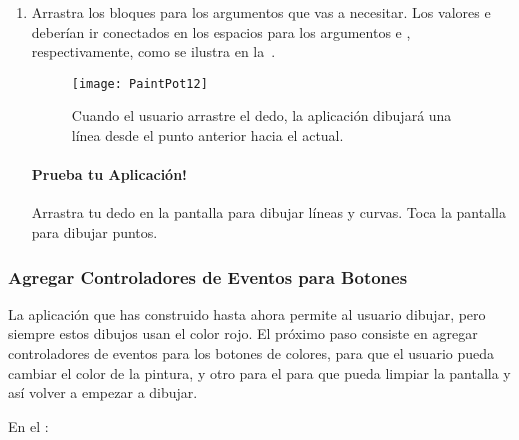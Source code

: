 \begin{enumerate}
\item Arrastra los bloques  para los argumentos que vas a
  necesitar. Los valores  e 
  deberían ir conectados en los espacios para los
  argumentos  e , respectivamente, como se
  ilustra en la~.

\begin{figure}[H]
\centering
\texttt{[image: PaintPot12]}
\caption{Cuando el usuario arrastre el dedo, la aplicación dibujará
  una línea desde el punto anterior hacia el actual.}
\label{fig:PaintPot12}
\end{figure}

\paragraph{Prueba tu Aplicación!} Arrastra tu dedo en la pantalla para
dibujar líneas y curvas. Toca la pantalla para dibujar puntos.

\end{enumerate}

\subsubsection*{Agregar Controladores de Eventos para Botones}

La aplicación que has construido hasta ahora permite al usuario
dibujar, pero siempre estos dibujos usan el color rojo. El próximo
paso consiste en agregar controladores de eventos para los botones de
colores, para que el usuario pueda cambiar el color de la pintura, y
otro para el  para que pueda limpiar la
pantalla y así volver a empezar a dibujar.

En el \blockEditor:

